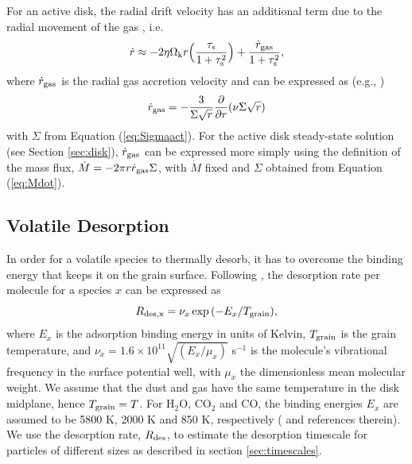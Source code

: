 \documentclass[apj]{emulateapj}
\begin{document}
For an active disk, the radial drift velocity has an additional term due to the radial movement of the gas \citep{birnstiel12}, i.e.
\begin{equation}
\label{eq:rdotact}
\dot{r} \approx -2 \eta \Omega_{\rm k} r \Big(\frac{\tau_{\rm s}}{1+\tau_{\rm s}^2}\Big) + \frac{\dot{r}_{\rm gas}}{1+\tau_{\rm s}^2},
\end{equation}
where $\dot{r}_{\rm gas}$ is the radial gas accretion velocity and can be expressed as (e.g., \citealt{fkr02})
\begin{equation}
\label{eq:vgas}
\dot{r}_{\rm gas} = - \frac{3}{\Sigma \sqrt{r}} \frac{\partial}{\partial r}(\nu \Sigma \sqrt{r}) 
\end{equation}
with $\Sigma$ from Equation (\ref{eq:Sigmaact}). For the active disk steady-state solution (see Section \ref{sec:disk}), $\dot{r}_{\rm gas}$ can be expressed more simply using the definition of the mass flux, $\dot{M}=-2 \pi r \dot{r}_{\rm gas} \Sigma$, with $\dot{M}$ fixed and $\Sigma$ obtained from Equation (\ref{eq:Mdot}). 

\subsection{Volatile Desorption}
\label{sec:desorption}


In order for a volatile species to thermally desorb, it has to overcome the binding energy that keeps it on the grain surface. Following \citet{hollenbach09}, the desorption rate per molecule for a species $x$ can be expressed as
\begin{equation}
\label{eq:Rdes}
R_{\rm{des}, x} = \nu_x \exp{(-E_x/T_{\rm grain})},
\end{equation}
where $E_x$ is the adsorption binding energy in units of Kelvin, $T_{\rm grain}$ is the grain temperature, and $\nu_x=1.6 \times 10^{11} \sqrt{(E_x/\mu_x)}$ s$^{-1}$ is the molecule's vibrational frequency in the surface potential well, with $\mu_x$ the dimensionless mean molecular weight. We assume that the dust and gas have the same temperature in the disk midplane, hence $T_{\rm grain}=T$. For H$_2$O, CO$_2$ and CO, the binding energies $E_x$ are assumed to be 5800 K, 2000 K and 850 K, respectively (\citealt{oberg11} and references therein). We use the desorption rate, $R_{\rm des}$, to estimate the desorption timescale for particles of different sizes as described in section \ref{sec:timescales}. 
\end{document}
